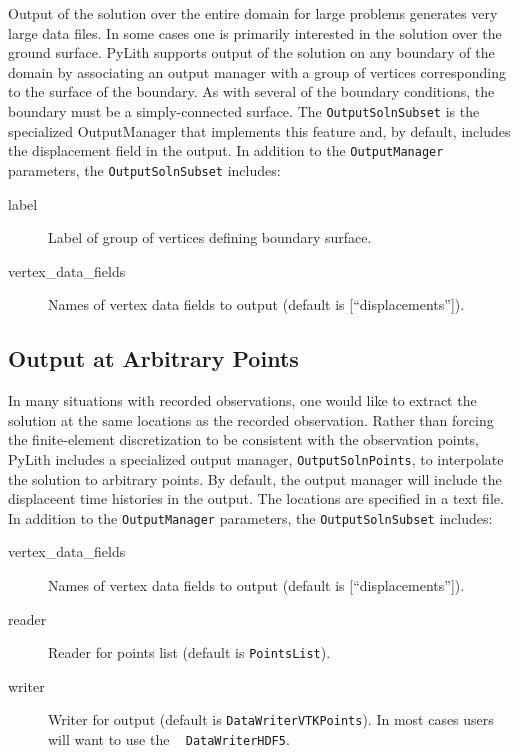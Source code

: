 Output of the solution over the entire domain for large problems generates
very large data files. In some cases one is primarily interested in
the solution over the ground surface. PyLith supports output of the
solution on any boundary of the domain by associating an output manager
with a group of vertices corresponding to the surface of the boundary.
As with several of the boundary conditions, the boundary must be a
simply-connected surface. The \texttt{OutputSolnSubset} is the specialized
OutputManager that implements this feature and, by default, includes
the displacement field in the output. In addition to the \texttt{OutputManager}
parameters, the \texttt{OutputSolnSubset} includes:
\begin{description}
\item [{label}] Label of group of vertices defining boundary surface.
\item [{vertex\_data\_fields}] Names of vertex data fields to output (default
is {[}``displacements''{]}).
\end{description}

\subsection{\label{sec:output:points}Output at Arbitrary Points}

In many situations with recorded observations, one would like to extract
the solution at the same locations as the recorded observation. Rather
than forcing the finite-element discretization to be consistent with
the observation points, PyLith includes a specialized output manager,
\texttt{OutputSolnPoints}, to interpolate the solution to arbitrary
points. By default, the output manager will include the displaceent
time histories in the output. The locations are specified in a text
file. In addition to the \texttt{OutputManager} parameters, the \texttt{OutputSolnSubset}
includes:
\begin{description}
\item [{vertex\_data\_fields}] Names of vertex data fields to output (default
is {[}``displacements''{]}).
\item [{reader}] Reader for points list (default is \texttt{PointsList}).
\item [{writer}] Writer for output (default is \texttt{DataWriterVTKPoints}).
In most cases users will want to use the \texttt{}~\linebreak{}
\texttt{DataWriterHDF5}.
\end{description}

